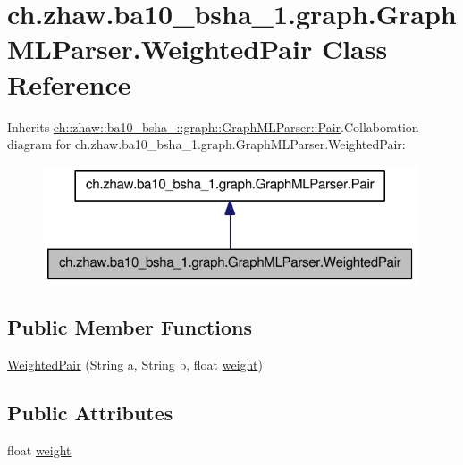 \hypertarget{classch_1_1zhaw_1_1ba10__bsha__1_1_1graph_1_1GraphMLParser_1_1WeightedPair}{
\section{ch.zhaw.ba10\_\-bsha\_\-1.graph.GraphMLParser.WeightedPair Class Reference}
\label{classch_1_1zhaw_1_1ba10__bsha__1_1_1graph_1_1GraphMLParser_1_1WeightedPair}
}


Inherits \hyperlink{classch_1_1zhaw_1_1ba10__bsha__1_1_1graph_1_1GraphMLParser_1_1Pair}{ch::zhaw::ba10\_\-bsha\_::graph::GraphMLParser::Pair}.Collaboration diagram for ch.zhaw.ba10\_\-bsha\_\-1.graph.GraphMLParser.WeightedPair:\nopagebreak
\begin{figure}[H]
\begin{center}
\leavevmode
\includegraphics[width=314pt]{classch_1_1zhaw_1_1ba10__bsha__1_1_1graph_1_1GraphMLParser_1_1WeightedPair__coll__graph}
\end{center}
\end{figure}
\subsection*{Public Member Functions}
\begin{DoxyCompactItemize}
\item 
\hyperlink{classch_1_1zhaw_1_1ba10__bsha__1_1_1graph_1_1GraphMLParser_1_1WeightedPair_a00b32480b91236c865394640e3df3ebb}{WeightedPair} (String a, String b, float \hyperlink{classch_1_1zhaw_1_1ba10__bsha__1_1_1graph_1_1GraphMLParser_1_1WeightedPair_ae275ca6ec6ffdb5d044cfd4d0765d8ea}{weight})
\end{DoxyCompactItemize}
\subsection*{Public Attributes}
\begin{DoxyCompactItemize}
\item 
float \hyperlink{classch_1_1zhaw_1_1ba10__bsha__1_1_1graph_1_1GraphMLParser_1_1WeightedPair_ae275ca6ec6ffdb5d044cfd4d0765d8ea}{weight}
\end{DoxyCompactItemize}


